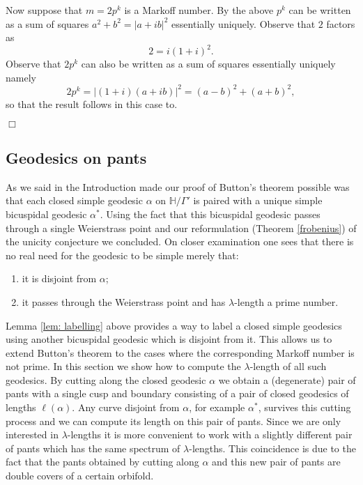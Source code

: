 \documentclass[12pt,a4paper]{amsart}
\def\HH{\mathbb{H}}
\def\xx{\HH/\Gamma'}
\begin{document}
Now suppose that  $m=2p^k$ is a Markoff number.
By the above  $p^k$ can be written as a sum of squares $a^2 + b^2 = |a + ib|^2$ 
essentially uniquely.
Observe that   $2$ factors as 
$$ 2 = i(1+i)^2.$$
Observe that $2 p^k$ can also  be written as a sum of squares
essentially uniquely namely
$$2p^k = |(1+i) (a + ib) |^2 =  (a-b)^2 + (a+b)^2,$$ 
so that the result follows in this case to.

\hfill $\Box$

\subsection{Geodesics on pants}\label{geos on pants}

As we said in the Introduction made our proof of Button's theorem possible was
that  each closed simple geodesic $\alpha$ on $\xx$ is paired with a unique
simple bicuspidal geodesic $\alpha^*$. Using the fact that this bicuspidal
geodesic passes through a single Weierstrass point and our reformulation
(Theorem \ref{frobenius}) of the unicity conjecture we concluded. On closer
examination one sees that there is no real need for the geodesic to be simple
merely that:

\begin{enumerate}
	\item it is disjoint from $\alpha$;
	\item it passes through the Weierstrass point and has $\lambda$-length a prime number.
\end{enumerate}

Lemma \ref{lem: labelling} above provides a way to label a closed simple
geodesics using another bicuspidal geodesic which is disjoint from it. This
allows us to extend Button's theorem to the cases where the corresponding
Markoff number is not prime. In this section we show how to compute the
$\lambda$-length of all such geodesics. By cutting along the closed geodesic
$\alpha$ we obtain a (degenerate) pair of pants with a single cusp and boundary
consisting of a pair of closed geodesics of lengths $\ell(\alpha)$. Any curve
disjoint from $\alpha$, for example $\alpha^*$, survives this cutting process
and we can compute its length on this pair of pants. Since we are only
interested in $\lambda$-lengths it is more convenient to work with a slightly
different pair of pants which has the same spectrum of $\lambda$-lengths. This
coincidence is due to the fact that the pants obtained by cutting along
$\alpha$ and this new pair of pants are double covers of a certain orbifold.
\end{document}
